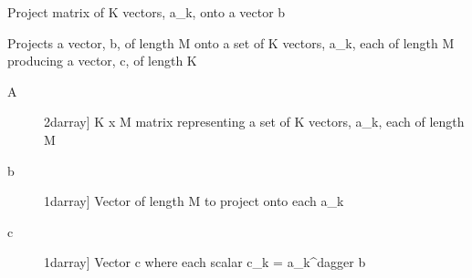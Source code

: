 \documentclass[letterpaper,10pt,english]{sphinxmanual}
\begin{document}

\begin{fulllineitems}
\label{\detokenize{infrapy.detection:infrapy.detection.beamforming_new.project_Ab}}
Project matrix of K vectors, a\_k, onto a vector b

Projects a vector, b, of length M onto a set of K vectors, a\_k,
each of length M producing a vector, c, of length K
\begin{description}
\item[{A}] \leavevmode{[}2darray{]}
K x M matrix representing a set of K vectors, a\_k, each of length M

\item[{b}] \leavevmode{[}1darray{]}
Vector of length M to project onto each a\_k

\end{description}
\begin{description}
\item[{c}] \leavevmode{[}1darray{]}
Vector c where each scalar c\_k = a\_k\textasciicircum{}dagger b

\end{description}

\end{fulllineitems}

\end{document}
